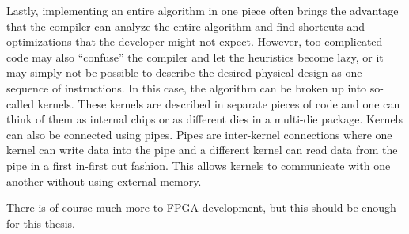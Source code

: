 Lastly, implementing an entire algorithm in one piece often brings the advantage that the compiler can analyze the entire algorithm and find shortcuts and optimizations that the developer might not expect. However, too complicated code may also ``confuse'' the compiler and let the heuristics become lazy, or it may simply not be possible to describe the desired physical design as one sequence of instructions. In this case, the algorithm can be broken up into so-called kernels. These kernels are described in separate pieces of code and one can think of them as internal chips or as different dies in a multi-die package. Kernels can also be connected using pipes. Pipes are inter-kernel connections where one kernel can write data into the pipe and a different kernel can read data from the pipe in a first in-first out fashion. This allows kernels to communicate with one another without using external memory.

There is of course much more to \ac{FPGA} development, but this should be enough for this thesis.